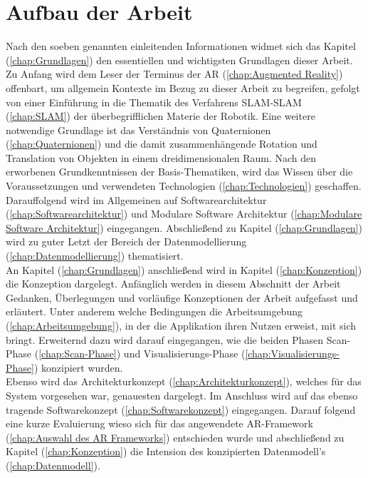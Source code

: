 \section{Aufbau der Arbeit}
\label{chap:Aufbau der Arbeit}
Nach den soeben genannten einleitenden Informationen widmet sich das Kapitel (\ref{chap:Grundlagen}) den essentiellen und wichtigsten 
Grundlagen dieser Arbeit. Zu Anfang wird dem Leser der Terminus der \acl{AR} (\ref{chap:Augmented Reality}) offenbart, um allgemein 
Kontexte im Bezug zu dieser Arbeit zu begreifen, gefolgt von einer Einführung in die Thematik des Verfahrens \ac{SLAM}-\acl{SLAM} 
(\ref{chap:SLAM}) der überbegrifflichen Materie der Robotik. Eine weitere notwendige Grundlage ist das Verständnis von Quaternionen 
(\ref{chap:Quaternionen}) und die damit zusammenhängende Rotation und Translation von Objekten in einem dreidimensionalen Raum. Nach 
den erworbenen Grundkenntnissen der Basis-Thematiken, wird das Wissen über die Voraussetzungen und verwendeten Technologien 
(\ref{chap:Technologien}) geschaffen. Darauffolgend wird im Allgemeinen auf Softwarearchitektur %
(\ref{chap:Softwarearchitektur}) und Modulare Software Architektur (\ref{chap:Modulare Software Architektur}) eingegangen. Abschließend zu 
Kapitel (\ref{chap:Grundlagen}) wird zu guter Letzt der Bereich der Datenmodellierung (\ref{chap:Datenmodellierung}) thematisiert.
\\ 
\linebreak
An Kapitel (\ref{chap:Grundlagen}) anschließend wird in Kapitel (\ref{chap:Konzeption}) die Konzeption dargelegt. Anfänglich werden in 
diesem Abschnitt der Arbeit Gedanken, Überlegungen und vorläufige Konzeptionen der Arbeit aufgefasst und erläutert. Unter anderem 
welche Bedingungen die Arbeitsumgebung (\ref{chap:Arbeitsumgebung}), in der die Applikation ihren Nutzen erweist, mit sich bringt. 
Erweiternd dazu wird darauf eingegangen, wie die beiden Phasen Scan-Phase (\ref{chap:Scan-Phase}) und Visualisierungs-Phase 
(\ref{chap:Visualisierungs-Phase}) konzipiert wurden. 
\\ 
Ebenso wird das Architekturkonzept (\ref{chap:Architekturkonzept}), welches für das System vorgesehen war, genauesten dargelegt. 
Im Anschluss wird auf das ebenso tragende Softwarekonzept (\ref{chap:Softwarekonzept}) eingegangen. Darauf folgend eine kurze Evaluierung wieso sich 
für das angewendete \acs{AR}-Framework (\ref{chap:Auswahl des AR Frameworks}) entschieden wurde und abschließend zu Kapitel 
(\ref{chap:Konzeption}) die Intension des konzipierten Datenmodell's (\ref{chap:Datenmodell}). 
